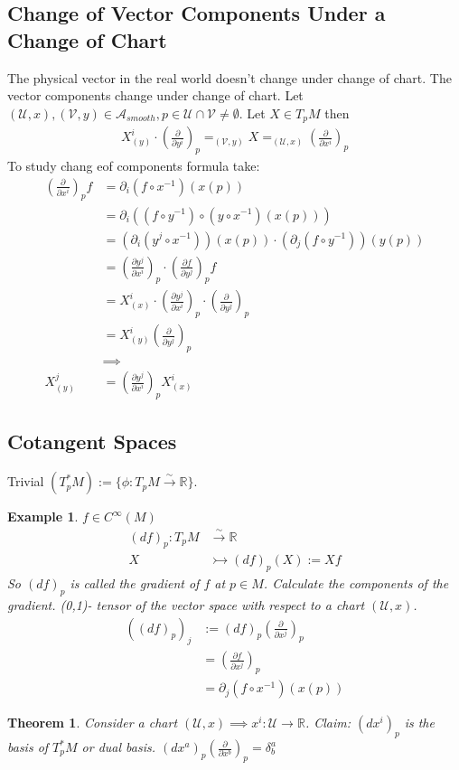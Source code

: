 \documentclass[10pt, oneside]{article}
\newcommand{\R}{\mathbb{R}}
\newtheorem{thm}{Theorem}
\newtheorem{example}{Example}
\begin{document}
  \subsection{Change of Vector Components Under a Change of Chart}
  The physical vector in the real world doesn't change under change of chart. The vector components change under change of chart.  Let $(\mathcal{U},x), (\mathcal{V},y) \in \mathcal{A}_{smooth}, p \in \mathcal{U} \cap \mathcal{V} \neq \emptyset$. Let $X \in T_p M$ then
  \begin{align*}
     X^i_{(y)}\cdot (\frac{\partial}{\partial y^i})_p =_{(\mathcal{V},y)} X =_{(\mathcal{U},x)} (\frac{\partial}{\partial x^i})_p
  \end{align*}
  To study chang eof components formula take:
  \begin{align*}
     (\frac{\partial}{\partial x^i})_p f &= \partial_i (f \circ x^{-1})(x(p)) \\
     &= \partial_i ((f \circ y^{-1})\circ(y \circ x^{-1})(x(p))) \\
     &= (\partial_i(y^j \circ x^{-1}))(x(p)) \cdot (\partial_j (f \circ y^{-1}))(y(p))\\
     &=(\frac{\partial y^j}{\partial x^i})_p \cdot (\frac{\partial f}{\partial y^j})_p f\\
     &= X^i_{(x)} \cdot (\frac{\partial y^j}{\partial x^i})_p \cdot (\frac{\partial}{\partial y^j})_p \\
     &= X^i_{(y)} (\frac{\partial}{\partial y^j})_p \\
     &\implies \\
     X^j_{(y)} &= (\frac{\partial y^j}{\partial x^i})_p X^i_{(x)}
  \end{align*}
  \subsection{Cotangent Spaces}
  Trivial $(T_p^* M) := \{\phi: T_p M \xrightarrow{\sim} \R \}$.
  \begin{example}
  $f \in C^{\infty}(M)$
  \begin{align*}
     (df)_p : T_p M &\xrightarrow{\sim} \R \\
     X &\rightarrowtail (df)_p (X):= X f
  \end{align*}
  So $(df)_p $ is called the gradient of $f$ at $p \in M$. Calculate the components of the gradient. (0,1)- tensor of the vector space with respect to a chart $(\mathcal{U},x)$.
  \begin{align*}
     ((df)_p)_j &:= (df)_p (\frac{\partial }{\partial x^j})_p  \\
     &= (\frac{\partial f}{\partial x^j})_p  \\
     &= \partial_j (f \circ x^{-1})(x(p))
  \end{align*}
  \end{example}
  \begin{thm}
     Consider a chart $(\mathcal{U},x) \implies x^i : \mathcal{U} \to \R$. Claim: $(dx^i)_p$ is the basis of $T_p^* M$ or dual basis. $(dx^a)_p (\frac{\partial}{\partial x^b})_p =\delta^a_b$
  \end{thm}
\end{document}
